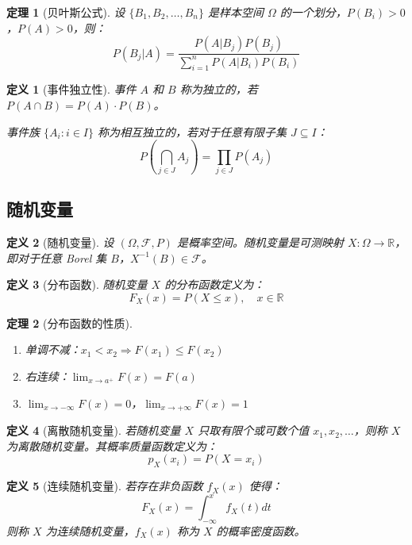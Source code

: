 \documentclass[12pt]{article}
\newtheorem{theorem}{定理}[section]
\newtheorem{definition}{定义}[section]
\begin{document}
\begin{theorem}[贝叶斯公式]
设 $\{B_1, B_2, \ldots, B_n\}$ 是样本空间 $\Omega$ 的一个划分，$P(B_i) > 0$，$P(A) > 0$，则：
$$P(B_j|A) = \frac{P(A|B_j) P(B_j)}{\sum_{i=1}^{n} P(A|B_i) P(B_i)}$$
\end{theorem}

\begin{definition}[事件独立性]
事件 $A$ 和 $B$ 称为独立的，若 $P(A \cap B) = P(A) \cdot P(B)$。

事件族 $\{A_i : i \in I\}$ 称为相互独立的，若对于任意有限子集 $J \subseteq I$：
$$P\left(\bigcap_{j \in J} A_j\right) = \prod_{j \in J} P(A_j)$$
\end{definition}

\subsection{随机变量}

\begin{definition}[随机变量]
设 $(\Omega, \mathcal{F}, P)$ 是概率空间。随机变量是可测映射 $X: \Omega \to \mathbb{R}$，即对于任意 Borel 集 $B$，$X^{-1}(B) \in \mathcal{F}$。
\end{definition}

\begin{definition}[分布函数]
随机变量 $X$ 的分布函数定义为：
$$F_X(x) = P(X \leq x), \quad x \in \mathbb{R}$$
\end{definition}

\begin{theorem}[分布函数的性质]
\begin{enumerate}
\item 单调不减：$x_1 < x_2 \Rightarrow F(x_1) \leq F(x_2)$
\item 右连续：$\lim_{x \to a^+} F(x) = F(a)$
\item $\lim_{x \to -\infty} F(x) = 0$，$\lim_{x \to +\infty} F(x) = 1$
\end{enumerate}
\end{theorem}

\begin{definition}[离散随机变量]
若随机变量 $X$ 只取有限个或可数个值 $x_1, x_2, \ldots$，则称 $X$ 为离散随机变量。其概率质量函数定义为：
$$p_X(x_i) = P(X = x_i)$$
\end{definition}

\begin{definition}[连续随机变量]
若存在非负函数 $f_X(x)$ 使得：
$$F_X(x) = \int_{-\infty}^{x} f_X(t) dt$$
则称 $X$ 为连续随机变量，$f_X(x)$ 称为 $X$ 的概率密度函数。
\end{definition}
\end{document}
